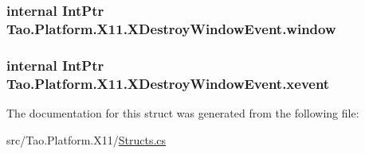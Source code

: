 \label{struct_tao_1_1_platform_1_1_x11_1_1_x_destroy_window_event_a351c579972c4933ea398b3704ea9561a}
\hypertarget{struct_tao_1_1_platform_1_1_x11_1_1_x_destroy_window_event_ab8c6755e1876b30e29e8fed0bc97882a}{
\subsubsection[{window}]{\setlength{\rightskip}{0pt plus 5cm}internal IntPtr {\bf Tao.Platform.X11.XDestroyWindowEvent.window}}}
\label{struct_tao_1_1_platform_1_1_x11_1_1_x_destroy_window_event_ab8c6755e1876b30e29e8fed0bc97882a}
\hypertarget{struct_tao_1_1_platform_1_1_x11_1_1_x_destroy_window_event_a7a93805c6ba1c0a9d46bdd7d7dd8b71d}{
\subsubsection[{xevent}]{\setlength{\rightskip}{0pt plus 5cm}internal IntPtr {\bf Tao.Platform.X11.XDestroyWindowEvent.xevent}}}
\label{struct_tao_1_1_platform_1_1_x11_1_1_x_destroy_window_event_a7a93805c6ba1c0a9d46bdd7d7dd8b71d}


The documentation for this struct was generated from the following file:\begin{DoxyCompactItemize}
\item 
src/Tao.Platform.X11/\hyperlink{_structs_8cs}{Structs.cs}\end{DoxyCompactItemize}
